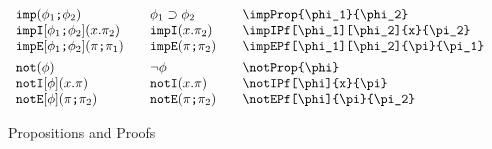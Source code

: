 \documentclass[11pt]{article}
\begin{document}
\begin{figure}
\begin{small}
\begin{displaymath}
\begin{array}{l@{\qquad}l@{\qquad}l@{\qquad}l}
        \impProp{\phi_1}{\phi_2}                        & \impProp*{\phi_1}{\phi_2}        & \verb|\impProp{\phi_1}{\phi_2}|                        \\
        \impIPf[\phi_1][\phi_2]{x}{\pi_2}               & \impIPf*{x}{\pi_2}               & \verb|\impIPf[\phi_1][\phi_2]{x}{\pi_2}|               \\
        \impEPf[\phi_1][\phi_2]{\pi}{\pi_1}             & \impEPf*{\pi}{\pi_2}             & \verb|\impEPf[\phi_1][\phi_2]{\pi}{\pi_1}|             \\[1ex]

        \notProp{\phi}                                  & \notProp*{\phi}                  & \verb|\notProp{\phi}|                                  \\
        \notIPf[\phi]{x}{\pi}                           & \notIPf*{x}{\pi}                 & \verb|\notIPf[\phi]{x}{\pi}|                           \\
        \notEPf[\phi]{\pi}{\pi_2}                       & \notEPf*{\pi}{\pi_2}             & \verb|\notEPf[\phi]{\pi}{\pi_2}|
      \end{array}
    \end{displaymath}
  \end{small}

  \caption{Propositions and Proofs}
  \label{fig:prop}
\end{figure}

\restoregeometry
\end{document}
